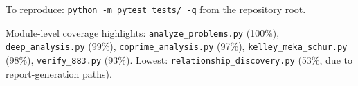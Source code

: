 \documentclass[11pt,a4paper]{article}
\theoremstyle{definition}
\theoremstyle{remark}
\begin{document}
To reproduce: \texttt{python -m pytest tests/ -q} from the repository root.

\noindent Module-level coverage highlights:
\texttt{analyze\_problems.py} (100\%), \texttt{deep\_analysis.py} (99\%),
\texttt{coprime\_analysis.py} (97\%), \texttt{kelley\_meka\_schur.py} (98\%),
\texttt{verify\_883.py} (93\%). Lowest: \texttt{relationship\_discovery.py}
(53\%, due to report-generation paths).
\end{document}
